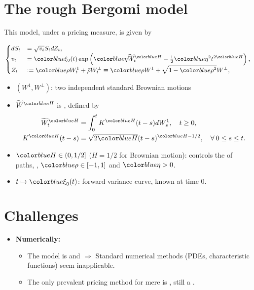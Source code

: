 \documentclass[ima, 20pt, portrait, plainboxedsections]{sciposter}
\begin{document}
\begin{multicols}{3}
\section*{The rough Bergomi model \cite{bayer2016pricing}}
This model, under a pricing measure, is given by
\begin{small}
\begin{equation}
\begin{small}
\begin{cases}
	dS_t &= \sqrt{v_t} S_t dZ_t,\\
v_t &= \blue{\xi_0}(t) \exp\left( \blue{\eta} \widetilde{W}_t^{\blue{H}} - \frac{1}{2} \blue{\eta}^2 t^{2\blue{H}} \right),\\
	Z_t&:=\blue{\rho}	W^1_t+ \bar{\rho}W^\perp_t \equiv \blue{\rho} W^1+\sqrt{1-\blue{\rho}^2} W^\perp,
\end{cases}
\end{small}
\end{equation}
\end{small}
\begin{itemize}
	\item $(W^1,W^\perp)$: two independent standard Brownian motions
	\item $\widetilde{W}^\blue{H} $ is ,  defined by
	\begin{align*}\label{eq:Volterra process}
	\widetilde{W}_t^{\blue{H}} &= \int_0^t K^{\blue{H}}(t-s) dW_s^1, \quad t \ge 0, \\ 	K^{\blue{H}}(t-s) &= \sqrt{2\blue{H}} (t-s)^{\blue{H} - 1/2},\quad \forall \: 0 \le s \le t.
	\end{align*}
	\item $\blue{H} \in(0,1/2]$ ($H=1/2$ for Brownian motion): controls the  of paths, , $\blue{\rho} \in [-1,1]$  and  $\blue{\eta}>0$.
	\item $t \mapsto \blue{\xi}_0(t)$: forward variance curve, known at time $0$.
\end{itemize}
\section*{Challenges}
\begin{itemize}
\item \textbf{Numerically:}
	\begin{itemize}
		\item The model is  and  $\Rightarrow$ Standard numerical methods (PDEs, characteristic functions) seem inapplicable.
		\item The only prevalent pricing method for mere
		 is  \cite{bayer2016pricing,bayer2017regularity,mccrickerd2018turbocharging}, still a .
		

\end{itemize}
\end{itemize}
\end{multicols}
\end{document}

